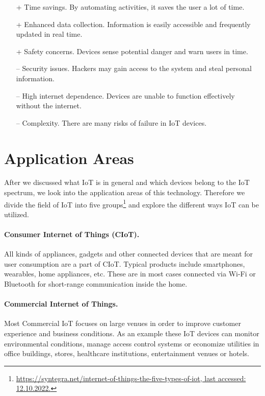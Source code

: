 \begin{itemize}
	\item[+] Time savings. By automating activities, it saves the user a lot of time.
	\item[+] Enhanced data collection. Information is easily accessible and frequently updated in real time.
	\item[+] Safety concerns. Devices sense potential danger and warn users in time. 
\end{itemize}

\begin{itemize}
	\item[--] Security issues. Hackers may gain access to the system and steal personal information.
	\item[--] High internet dependence. Devices are unable to function effectively without the internet.
	\item[--] Complexity. There are many risks of failure in IoT devices.
\end{itemize}


\section{Application Areas}\label{sec:areas}
After we discussed what IoT is in general and which devices belong to the IoT spectrum, we look into the application areas of this technology. Therefore we divide the field of IoT into five groups\footnote{\href{https://syntegra.net/internet-of-things-the-five-types-of-iot}{https://syntegra.net/internet-of-things-the-five-types-of-iot, last accessed: 12.10.2022.}} and explore the different ways IoT can be utilized.

\paragraph{Consumer Internet of Things (CIoT).}
All kinds of appliances, gadgets and other connected devices that are meant for user consumption are a part of CIoT. Typical products include smartphones, wearables, home appliances, etc. These are in most cases connected via Wi-Fi or Bluetooth for short-range communication inside the home. 

\paragraph{Commercial Internet of Things.}
Most Commercial IoT focuses on large venues in order to improve customer experience and business conditions. As an example these IoT devices can monitor environmental conditions, manage access control systems or economize utilities in office buildings, stores, healthcare institutions, entertainment venues or hotels.

